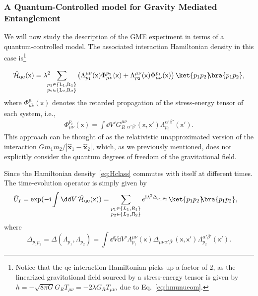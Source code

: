 \documentclass[letterpaper,12pt,titlepage,oneside,final]{book}
\newcommand{\mf}{\mathsf}%
\newcommand{\ii}{\mathrm{i}}
\newcommand{\tc}[1]{\textsc{#1}}
\begin{document}
\subsubsection*{A Quantum-Controlled model for Gravity Mediated Entanglement}


We will now study the description of the GME experiment in terms of a quantum-controlled model. The associated interaction Hamiltonian density in this case is\footnote{Notice that the qc-interaction Hamiltonian picks up a factor of $2$, as the linearized gravitational field sourced by a stress-energy tensor is given by $h = - \sqrt{8 \pi G} G_RT_{\mu\nu} = - 2 \lambda G_R T_{\mu\nu}$, due to Eq.~\eqref{eq:hmunueom}.}

\begin{equation}\label{eq:Hclass}
    \hat{\mathcal{H}}_{\tc{qc}}(\mf x) = \lambda^2\!\!\!\!\sum_{{\substack{p_1\in\{\tc{L}_1,\tc{R}_1\}\\p_2\in\{\tc{L}_2,\tc{R}_2\}}}} \left(\Lambda^{\mu\nu}_{p_1}(\mf x){\Phi_{\mu\nu}^{p_2}(\mf x)} + \Lambda^{\mu\nu}_{p_2}(\mf x){\Phi_{\mu\nu}^{p_1}(\mf x)}\right)\ket{p_1p_2}\!\!\bra{p_1p_2} ,
\end{equation}
where $\Phi^{p_1}_{\mu\nu}(\mf x)$ denotes the retarded propagation of the stress-energy tensor of each system, i.e.,
\begin{align}
    \Phi^{p_i}_{\mu\nu}(\mf x) = \int \dd V' G_R^{\mu\nu}{}_{\alpha'\beta'}(\mf x,\mf x') \Lambda^{\alpha'\beta'}_{p_i}(\mf x').
\end{align}
This approach can be thought of as the relativistic unapproximated version of the interaction \mbox{$Gm_1m_2/|\hat{\bm x}_1 - \hat{\bm x}_2|$}, which, as we previously mentioned, does not explicitly consider the quantum degrees of freedom of the gravitational field. 


Since the Hamiltonian density~\eqref{eq:Hclass} commutes with itself at different times. The time-evolution operator is simply given by
\begin{align}
    \hat{U}_I &= \exp({-\ii \int\dd V\,\hat{\mathcal{H}}_\tc{qc}(\mf x)}) =  \sum_{{\substack{p_1\in\{L_1,R_1\}\\p_2\in\{L_2,R_2\}}}} e^{{\ii\lambda^2} \Delta_{p_1p_2}}\ket{p_1 p_2}\!\!\bra{p_1p_2},
\end{align}
where
\begin{equation}
    \Delta_{p_1p_2} = \Delta(\Lambda_{p_1},\Lambda_{p_2}) = \displaystyle{\int} \dd V \dd V' \Lambda_{p_1}^{\mu\nu}(\mf x)\Delta_{\mu\nu}{}_{\alpha'\beta'}(\mf x,\mf x') \Lambda_{p_2}^{\alpha'\beta'}(\mf x').
\end{equation}
\end{document}
